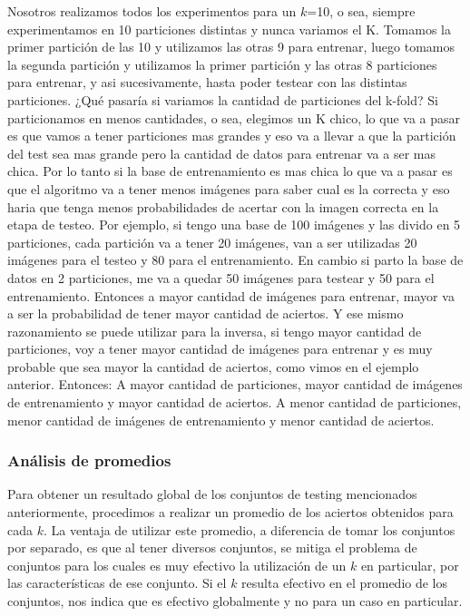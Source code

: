 Nosotros realizamos todos los experimentos para un $k$=10, o sea, siempre experimentamos en 10 particiones distintas y nunca variamos el K. Tomamos la primer partición de las 10 y utilizamos las otras 9 para entrenar, luego tomamos la segunda partición y utilizamos la primer partición y las otras 8 particiones para entrenar, y asi sucesivamente, hasta poder testear con las distintas particiones.
¿Qué pasaría si variamos la cantidad de particiones del k-fold?
Si particionamos en menos cantidades, o sea, elegimos un K chico, lo que va a pasar es que vamos a tener particiones mas grandes y eso va a llevar a que la partición del test sea mas grande pero la cantidad de datos para entrenar va a ser mas chica. Por lo tanto si la base de entrenamiento es mas chica lo que va a pasar es que el algoritmo va a tener menos imágenes para saber cual es la correcta y eso haria que tenga menos probabilidades de acertar con la imagen correcta en la etapa de testeo.
Por ejemplo, si tengo una base de 100 imágenes y las divido en 5 particiones, cada partición va a tener 20 imágenes, van a ser utilizadas 20 imágenes para el testeo y 80 para el entrenamiento. En cambio si parto la base de datos en 2 particiones, me va a quedar 50 imágenes para testear y 50 para el entrenamiento. Entonces a mayor cantidad de imágenes para entrenar, mayor va a ser la probabilidad de tener mayor cantidad de aciertos.
Y ese mismo razonamiento se puede utilizar para la inversa, si tengo mayor cantidad de particiones, voy a tener mayor cantidad de imágenes para entrenar y es muy probable que sea mayor la cantidad de aciertos, como vimos en el ejemplo anterior.
Entonces:
    A mayor cantidad de particiones, mayor cantidad de imágenes de entrenamiento y mayor cantidad de aciertos.
    A menor cantidad de particiones, menor cantidad de imágenes de entrenamiento y menor cantidad de aciertos.

\subsubsection{Análisis de promedios}

Para obtener un resultado global de los conjuntos de testing mencionados anteriormente, procedimos a realizar un promedio de los aciertos obtenidos para cada $k$.
La ventaja de utilizar este promedio, a diferencia de tomar los conjuntos por separado, es que al tener diversos conjuntos, se mitiga el problema de conjuntos para los cuales es muy efectivo la utilización de un $k$ en particular, por las características de ese conjunto. Si el $k$ resulta efectivo en el promedio de los conjuntos, nos indica que es efectivo globalmente y no para un caso en particular.

